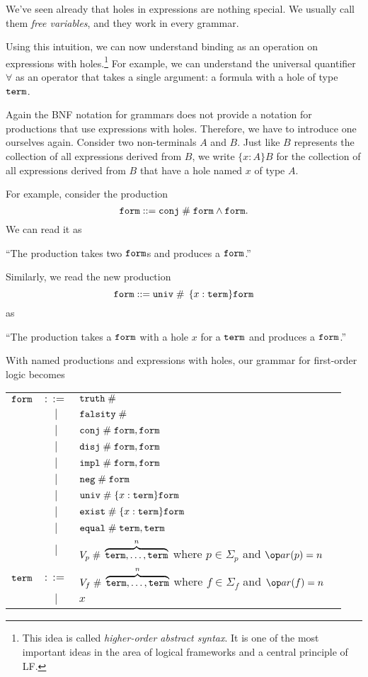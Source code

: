 We've seen already that holes in expressions are nothing special. We usually call them \emph{free variables}, and they work in every grammar.

Using this intuition, we can now understand binding as an operation on expressions with holes.\footnote{This idea is called \emph{higher-order abstract syntax}. It is one of the most important ideas in the area of logical frameworks and a central principle of LF.} For example, we can understand the universal quantifier $\forall$ as an operator that takes a single argument: a formula with a hole of type $\mathtt{term}$.
\medskip

Again the BNF notation for grammars does not provide a notation for productions that use expressions with holes. Therefore, we have to introduce one ourselves again. Consider two non-terminals $A$ and $B$. Just like $B$ represents the collection of all expressions derived from $B$, we write $\{x:A\}B$ for the collection of all expressions derived from $B$ that have a hole named $x$ of type $A$.

For example, consider the production
 \[\mathtt{form}::=\mathtt{conj}\;\#\;\mathtt{form}\wedge\mathtt{form}.\]
We can read it as
\begin{center}
  ``The production  takes two $\mathtt{form}$s and produces a $\mathtt{form}$.''
\end{center}
Similarly, we read the new production
 \[\mathtt{form}::=\mathtt{univ}\;\#\;\,\{x:\mathtt{term}\}\mathtt{form}\]
as
\begin{center}``The production  takes a $\mathtt{form}$ with a hole $x$ for a $\mathtt{term}$ and produces a $\mathtt{form}$.''\end{center}
\medskip

With named productions and expressions with holes, our grammar for first-order logic becomes
\begin{center}
\begin{tabular}{lcl@{\tb}l}
$\mathtt{form}$ & $::=$
               & $\mathtt{truth}\;\#\;$ & \\
     &  $|$  & $\mathtt{falsity}\;\#\;$ &  \\
     &  $|$  & $\mathtt{conj}\;\#\;\mathtt{form}, \mathtt{form}$ &  \\
     &  $|$  & $\mathtt{disj}\;\#\;\mathtt{form}, \mathtt{form}$ &  \\
     &  $|$  & $\mathtt{impl}\;\#\;\mathtt{form}, \mathtt{form}$ &  \\
     &  $|$  & $\mathtt{neg}\;\#\; \mathtt{form}$ & \\
     &  $|$  & $\mathtt{univ}\;\#\; \{x:\mathtt{term}\} \mathtt{form}$ & \\
     &  $|$  & $\mathtt{exist}\;\#\; \{x:\mathtt{term}\} \mathtt{form}$ & \\
     &  $|$  & $\mathtt{equal}\;\#\;\mathtt{term}, \mathtt{term}$ &  \\
     &  $|$  & $V_p\;\#\;\overbrace{\mathtt{term},\ldots,\mathtt{term}}^n$ where $p\in\Sigma_p$ and $\arit(p)=n$& \\
$\mathtt{term}$ & $::=$ & $V_f\;\#\;\overbrace{\mathtt{term},\ldots,\mathtt{term}}^n$ where $f\in\Sigma_f$ and $\arit(f)=n$ & \\
        &  $|$  & $x$ & \\
\end{tabular}
\end{center}

